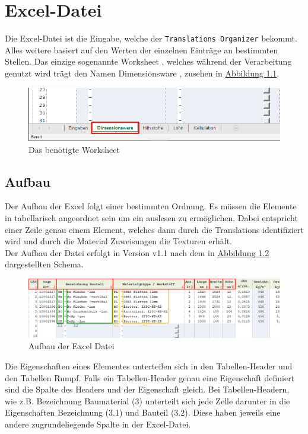 \documentclass{book}
\newcommand{\assisttool}{\texttt{Translations Organizer}\xspace}
\begin{document}
	\chapter{Excel-Datei}\label{excel}
		Die Excel-Datei ist die Eingabe, welche der \assisttool bekommt. Alles weitere basiert auf den Werten der einzelnen Einträge an bestimmten Stellen. Das einzige sogenannte \glqq Worksheet \grqq, welches während der Verarbeitung genutzt wird trägt den Namen \glqq Dimensionsware \grqq, zusehen in \hyperref[fig:dimensionsware worksheet]{Abbildung \ref{fig:dimensionsware worksheet}}.		
		\begin{figure}[H]
			\centering
			\includegraphics[scale=0.48]{pics/excel/reiter_auswaehlen.png}
			\caption{Das benötigte \glqq Worksheet \grqq}
			\label{fig:dimensionsware worksheet}
		\end{figure}
		
		\section{Aufbau}
			Der Aufbau der Excel folgt einer bestimmten Ordnung. Es müssen die Elemente in tabellarisch angeordnet sein um ein auslesen zu ermöglichen. Dabei entspricht einer Zeile genau einem Element, welches dann durch die Translations identifiziert wird und durch die Material Zuweisungen die Texturen erhält. \\
			Der Aufbau der Datei erfolgt in Version v1.1 nach dem in \hyperref[fig:excel file]{Abbildung \ref{fig:excel file}} dargestellten Schema.
			
			\begin{figure}[H]
				\centering
				\includegraphics[scale=0.48]{pics/excel/dimensionsware.png}
				\caption{Aufbau der Excel Datei}
				\label{fig:excel file}
			\end{figure}
		
			Die Eigenschaften eines Elementes unterteilen sich in den Tabellen-Header und den Tabellen Rumpf. Falls ein Tabellen-Header genau eine Eigenschaft definiert sind die Spalte des Headers und der Eigenschaft gleich. Bei Tabellen-Headern, wie z.B. \glqq Bezeichnung Baumaterial \grqq (3) unterteilt sich jede Zelle darunter in die Eigenschaften \glqq Bezeichnung \grqq (3.1) und \glqq Bauteil \grqq (3.2). Diese haben jeweils eine andere zugrundeliegende Spalte in der Excel-Datei.\\
			
\end{document}

